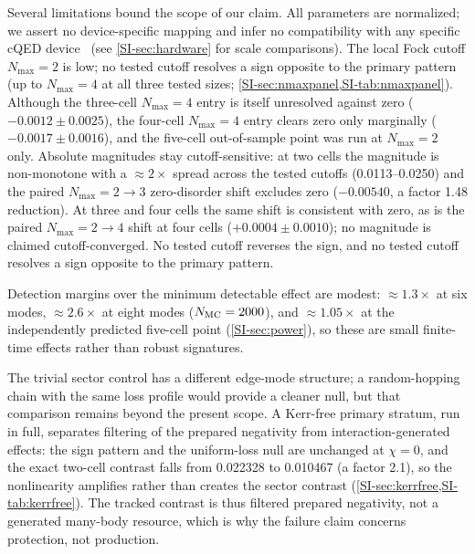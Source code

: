 \documentclass[aps,pra,preprint,superscriptaddress,amsmath,amssymb]{revtex4-2}
\begin{document}
Several limitations bound the scope of our claim. All parameters are normalized; we assert no device-specific mapping and infer no compatibility with any specific cQED device~\cite{Blais2021Circuit} (see \cref{SI-sec:hardware} for scale comparisons). The local Fock cutoff $N_{\max}=\num{2}$ is low; no tested cutoff resolves a sign opposite to the primary pattern (up to $N_{\max}=\num{4}$ at all three tested sizes; \cref{SI-sec:nmaxpanel,SI-tab:nmaxpanel}). Although the three-cell $N_{\max}=\num{4}$ entry is itself unresolved against zero ($-\num{0.0012}\pm\num{0.0025}$), the four-cell $N_{\max}=\num{4}$ entry clears zero only marginally ($-\num{0.0017}\pm\num{0.0016}$), and the five-cell out-of-sample point was run at $N_{\max}=\num{2}$ only. Absolute magnitudes stay cutoff-sensitive: at two cells the magnitude is non-monotone with a $\approx\num{2}\times$ spread across the tested cutoffs (\num{0.0113}--\num{0.0250}) and the paired $N_{\max}=\num{2}\to\num{3}$ zero-disorder shift excludes zero ($-\num{0.00540}$, a factor \num{1.48} reduction). At three and four cells the same shift is consistent with zero, as is the paired $N_{\max}=\num{2}\to\num{4}$ shift at four cells ($+\num{0.0004}\pm\num{0.0010}$); no magnitude is claimed cutoff-converged. No tested cutoff reverses the sign, and no tested cutoff resolves a sign opposite to the primary pattern.

Detection margins over the minimum detectable effect are modest: $\approx\num{1.3}\times$ at six modes, $\approx\num{2.6}\times$ at eight modes ($N_{\rm MC}=\num{2000}$), and $\approx\num{1.05}\times$ at the independently predicted five-cell point (\cref{SI-sec:power}), so these are small finite-time effects rather than robust signatures.

The trivial sector control has a different edge-mode structure; a random-hopping chain with the same loss profile would provide a cleaner null, but that comparison remains beyond the present scope. A Kerr-free primary stratum, run in full, separates filtering of the prepared negativity from interaction-generated effects: the sign pattern and the uniform-loss null are unchanged at $\chi=0$, and the exact two-cell contrast falls from \num{0.022328} to \num{0.010467} (a factor \num{2.1}), so the nonlinearity amplifies rather than creates the sector contrast (\cref{SI-sec:kerrfree,SI-tab:kerrfree}). The tracked contrast is thus filtered prepared negativity, not a generated many-body resource, which is why the failure claim concerns protection, not production.
\end{document}

